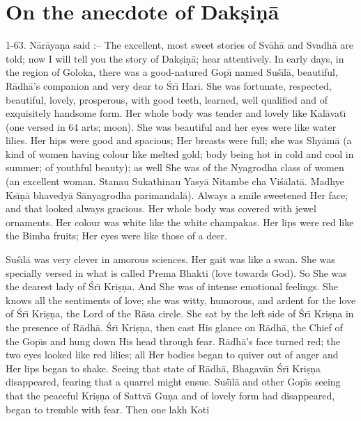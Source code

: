 \chapter{On the anecdote of Dak\d{s}i\d{n}\=a}

1-63. N\=ar\=aya\d{n}a said :-- The excellent, most sweet stories of Sv\=ah\=a and Svadh\=a are told; now I will tell you the story of Dak\d{s}i\d{n}\=a; hear attentively. In early days, in the region of Goloka, there was a good-natured Gop\={\i} named Su\'s\={\i}l\=a, beautiful, R\=adh\=a's companion and very dear to \'Sr\={\i} Hari. She was fortunate, respected, beautiful, lovely, prosperous, with good teeth, learned, well qualified and of exquisitely handsome form. Her whole body was tender and lovely like Kal\=avat\={\i} (one versed in 64 arts; moon). She was beautiful and her eyes were like water lilies. Her hips were good and spacious; Her breasts were full; she was Shy\=am\=a (a kind of women having colour like melted gold; body being hot in cold and cool in summer; of youthful beauty); as well She was of the Nyagrodha class of women (an excellent woman. Stanau Sukathinau Yasy\=a Nitambe cha Vi\'s\=alat\=a. Madhye Ks\={\i}\d{n}\=a bhavedy\=a S\=anyagrodha parimandal\=a). Always a smile sweetened Her face; and that looked always gracious. Her whole body was covered with jewel ornaments. Her colour was white like the white champakas. Her lips were red like the Bimba fruits; Her eyes were like those of a deer.

Su\'s\={\i}l\=a was very clever in amorous sciences. Her gait was like a swan. She was specially versed in what is called Prema Bhakti (love towards God). So She was the dearest lady of \'Sr\={\i} Kri\d{s}\d{n}a. And She was of intense emotional feelings. She knows all the sentiments of love; she was witty, humorous, and ardent for the love of \'Sr\={\i} Kri\d{s}\d{n}a, the Lord of the R\=asa circle. She sat by the left side of \'Sr\={\i} Kri\d{s}\d{n}a in the presence of R\=adh\=a. \'Sr\={\i} Kri\d{s}\d{n}a, then cast His glance on R\=adh\=a, the Chief of the Gop\={\i}s and hung down His head through fear. R\=adh\=a's face turned red; the two eyes looked like red lilies; all Her bodies began to quiver out of anger and Her lips began to shake. Seeing that state of R\=adh\=a, Bhagav\=an \'Sr\={\i} Kri\d{s}\d{n}a disappeared, fearing that a quarrel might ensue. Su\'s\={\i}l\=a and other Gop\={\i}s seeing that the peaceful Kri\d{s}\d{n}a of Sattv\=a Gu\d{n}a and of lovely form had disappeared, began to tremble with fear. Then one lakh Koti

